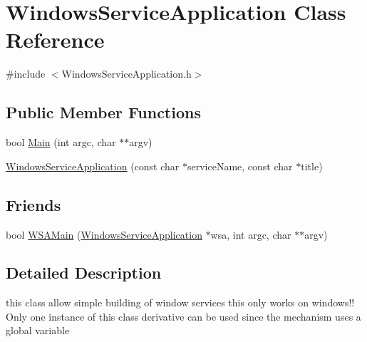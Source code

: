\hypertarget{classWindowsServiceApplication}{
\section{WindowsServiceApplication Class Reference}
\label{classWindowsServiceApplication}
}


{\ttfamily \#include $<$WindowsServiceApplication.h$>$}

\subsection*{Public Member Functions}
\begin{DoxyCompactItemize}
\item 
bool \hyperlink{classWindowsServiceApplication_a04def6eaee00fa79d249d341dab7b11f}{Main} (int argc, char $\ast$$\ast$argv)
\item 
\hyperlink{classWindowsServiceApplication_ac4bc29d1d8efeba0190f6b4d5c99ae67}{WindowsServiceApplication} (const char $\ast$serviceName, const char $\ast$title)
\end{DoxyCompactItemize}
\subsection*{Friends}
\begin{DoxyCompactItemize}
\item 
bool \hyperlink{classWindowsServiceApplication_ab6e5bf4c1ae7515070871d380387d42b}{WSAMain} (\hyperlink{classWindowsServiceApplication}{WindowsServiceApplication} $\ast$wsa, int argc, char $\ast$$\ast$argv)
\end{DoxyCompactItemize}


\subsection{Detailed Description}
this class allow simple building of window services this only works on windows!! Only one instance of this class derivative can be used since the mechanism uses a global variable 

